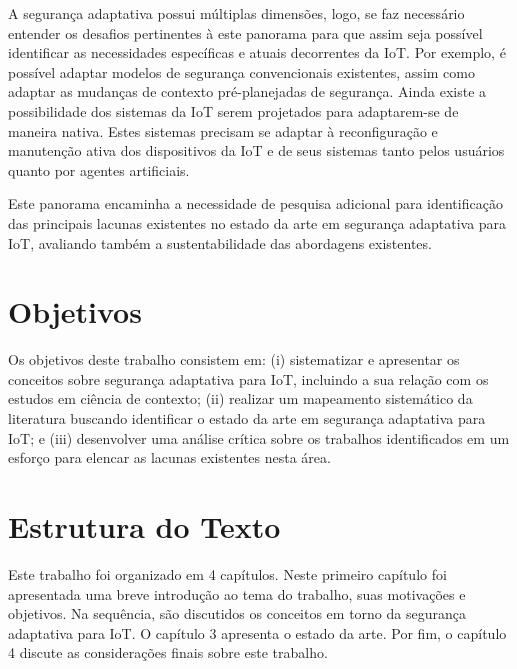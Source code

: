 \documentclass[tid,table]{texufpel} %
\begin{document}
A segurança adaptativa possui múltiplas dimensões, logo, se faz necessário entender os desafios pertinentes à este panorama para que assim seja possível identificar as necessidades específicas e atuais decorrentes da IoT. Por exemplo, é possível adaptar modelos de segurança convencionais existentes, assim como adaptar as mudanças de contexto pré-planejadas de segurança. Ainda existe a possibilidade dos sistemas da IoT serem projetados para adaptarem-se de maneira nativa. Estes sistemas precisam se adaptar à reconfiguração e manutenção ativa dos dispositivos da IoT e de seus sistemas tanto pelos usuários quanto por agentes artificiais.

Este panorama encaminha a necessidade de pesquisa adicional para identificação das principais lacunas existentes no estado da arte em segurança adaptativa para IoT, avaliando também a sustentabilidade das abordagens existentes.

\section{Objetivos}

Os objetivos deste trabalho consistem em: (i) sistematizar e apresentar os conceitos sobre segurança adaptativa para IoT, incluindo a sua relação com os estudos em ciência de contexto; (ii) realizar um mapeamento sistemático da literatura buscando identificar o estado da arte em segurança adaptativa para IoT; e (iii) desenvolver uma análise crítica sobre os trabalhos identificados em um esforço para elencar as lacunas existentes nesta área.


\section{Estrutura do Texto}

Este trabalho foi organizado em 4 capítulos. Neste primeiro capítulo foi apresentada uma breve introdução ao tema do trabalho, suas motivações e objetivos. Na sequência, são discutidos os conceitos em torno da segurança adaptativa para IoT. O capítulo 3 apresenta o estado da arte. Por fim, o capítulo 4 discute as considerações finais sobre este trabalho.



\end{document}
